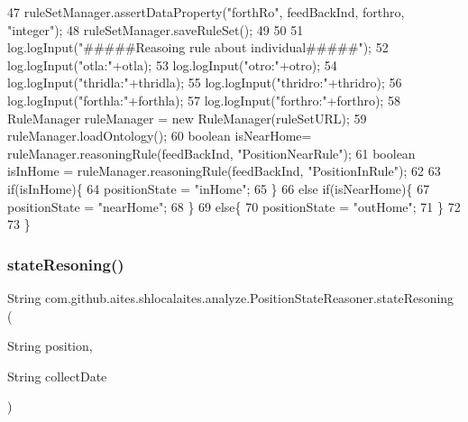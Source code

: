 \begin{DoxyCode}
47         ruleSetManager.assertDataProperty(\textcolor{stringliteral}{"forthRo"}, feedBackInd, forthro, \textcolor{stringliteral}{"integer"});
48         ruleSetManager.saveRuleSet();
49         
50 
51         log.logInput(\textcolor{stringliteral}{"#####Reasoing rule about individual#####"});
52         log.logInput(\textcolor{stringliteral}{"otla:"}+otla);
53         log.logInput(\textcolor{stringliteral}{"otro:"}+otro);
54         log.logInput(\textcolor{stringliteral}{"thridla:"}+thridla);
55         log.logInput(\textcolor{stringliteral}{"thridro:"}+thridro);
56         log.logInput(\textcolor{stringliteral}{"forthla:"}+forthla);
57         log.logInput(\textcolor{stringliteral}{"forthro:"}+forthro);
58         RuleManager ruleManager = \textcolor{keyword}{new} RuleManager(ruleSetURL);
59         ruleManager.loadOntology(); 
60         \textcolor{keywordtype}{boolean} isNearHome= ruleManager.reasoningRule(feedBackInd, \textcolor{stringliteral}{"PositionNearRule"});
61         \textcolor{keywordtype}{boolean} isInHome = ruleManager.reasoningRule(feedBackInd, \textcolor{stringliteral}{"PositionInRule"});
62     
63         \textcolor{keywordflow}{if}(isInHome)\{
64             positionState = \textcolor{stringliteral}{"inHome"};
65         \}
66         \textcolor{keywordflow}{else} \textcolor{keywordflow}{if}(isNearHome)\{
67             positionState = \textcolor{stringliteral}{"nearHome"};
68         \}
69         \textcolor{keywordflow}{else}\{
70             positionState = \textcolor{stringliteral}{"outHome"};
71         \}
72         
73     \}
\end{DoxyCode}
\mbox{\label{classcom_1_1github_1_1aites_1_1shlocalaites_1_1analyze_1_1_position_state_reasoner_aa1ff3849b927ad2cd990e61aa3c365bb}} 
\subsubsection{\texorpdfstring{state\+Resoning()}{stateResoning()}}
{\footnotesize\ttfamily String com.\+github.\+aites.\+shlocalaites.\+analyze.\+Position\+State\+Reasoner.\+state\+Resoning (\begin{DoxyParamCaption}\item[{String}]{position,  }\item[{String}]{collect\+Date }\end{DoxyParamCaption})}



